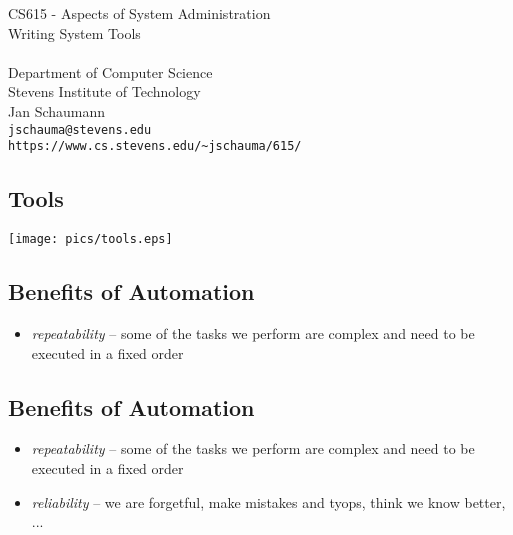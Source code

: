 \documentclass[xga]{xdvislides}
\begin{document}
\setfontphv

\lhead{\slidetitle}                               %
\cfoot{\relax}                               %
\rfoot{\Gray{\today}}

\vspace*{\fill}
\begin{center}
	\Hugesize
		CS615 - Aspects of System Administration\\ [1em]
		Writing System Tools\\ [1em]

	\hspace*{5mm}\blueline\\ [1em]
	\Normalsize
		Department of Computer Science\\
		Stevens Institute of Technology\\
		Jan Schaumann\\
		\verb+jschauma@stevens.edu+\\
		\verb+https://www.cs.stevens.edu/~jschauma/615/+
\end{center}
\vspace*{\fill}

\subsection{Tools}
\vspace*{\fill}
\begin{center}
	\texttt{[image: pics/tools.eps]}
\end{center}
\vspace*{\fill}

\subsection{Benefits of Automation}
\begin{itemize}
	\item {\em repeatability} -- some of the tasks we
		perform are complex and need to be
		executed in a fixed order
\end{itemize}

\subsection{Benefits of Automation}
\begin{itemize}
	\item {\em repeatability} -- some of the tasks we
		perform are complex and need to be
		executed in a fixed order
	\item {\em reliability} -- we are forgetful, make
		mistakes and tyops, think we know
		better, ...
\end{itemize}
\end{document}
